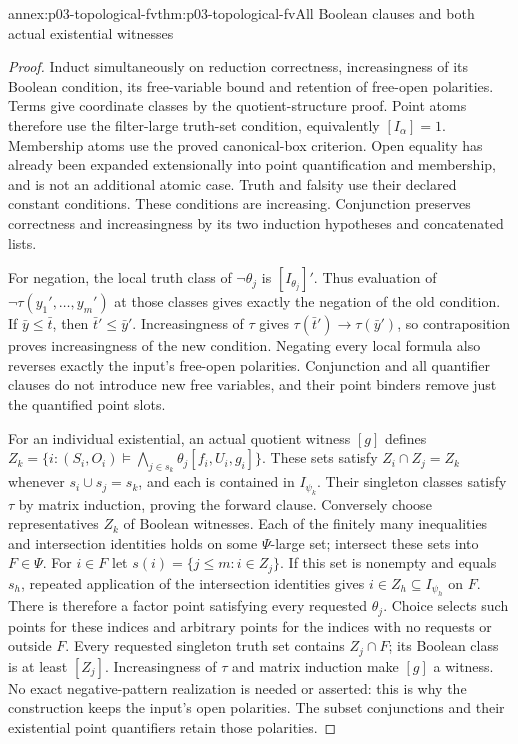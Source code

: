 \begin{annexitem}{annex:p03-topological-fv}{thm:p03-topological-fv}{All Boolean clauses and both actual existential witnesses}
\begin{proof}
Induct simultaneously on reduction correctness, increasingness of its
Boolean condition, its free-variable bound and retention of free-open
polarities. Terms give coordinate classes by the quotient-structure proof.
Point atoms therefore use the filter-large truth-set condition, equivalently
\([I_\alpha]=1\). Membership atoms use the proved canonical-box
criterion. Open equality has already been expanded extensionally into point
quantification and membership, and is not an additional atomic case.
Truth and falsity use their declared constant conditions.
These conditions are increasing. Conjunction preserves correctness and
increasingness by its two induction hypotheses and concatenated lists.

For negation, the local truth class of \(\neg\theta_j\) is
\([I_{\theta_j}]'\). Thus evaluation of
\(\neg\tau(y_1',\ldots,y_m')\) at those classes gives exactly
the negation of the old condition. If \(\bar y\le\bar t\), then
\(\bar t'\le\bar y'\). Increasingness of \(\tau\) gives
\(\tau(\bar t')\to\tau(\bar y')\), so contraposition proves
increasingness of the new condition. Negating every local formula also
reverses exactly the input's free-open polarities. Conjunction and all
quantifier clauses do not introduce new free variables, and their point
binders remove just the quantified point slots.

For an individual existential, an actual quotient witness \([g]\)
defines
\(Z_k=\{i:(S_i,O_i)\models\bigwedge_{j\in s_k}\theta_j[f_i,U_i,g_i]\}\).
These sets satisfy \(Z_i\cap Z_j=Z_k\) whenever
\(s_i\cup s_j=s_k\), and each is contained in \(I_{\psi_k}\).
Their singleton classes satisfy \(\tau\) by matrix induction, proving
the forward clause.
Conversely choose representatives \(Z_k\) of Boolean witnesses.
Each of the finitely many inequalities and intersection identities holds
on some \(\Psi\)-large set; intersect these sets into \(F\in\Psi\).
For \(i\in F\) let \(s(i)=\{j\le m:i\in Z_j\}\).
If this set is nonempty and equals \(s_h\), repeated application of
the intersection identities gives
\(i\in Z_h\subseteq I_{\psi_h}\) on \(F\).
There is therefore a factor point satisfying every requested
\(\theta_j\). Choice selects such points for these indices and
arbitrary points for the indices with no requests or outside \(F\).
Every requested singleton truth set contains \(Z_j\cap F\);
its Boolean class is at least \([Z_j]\). Increasingness of \(\tau\)
and matrix induction make \([g]\) a witness. No exact negative-pattern
realization is needed or asserted: this is why the construction keeps
the input's open polarities. The subset conjunctions and their existential
point quantifiers retain those polarities.


\end{proof}
\end{annexitem}
